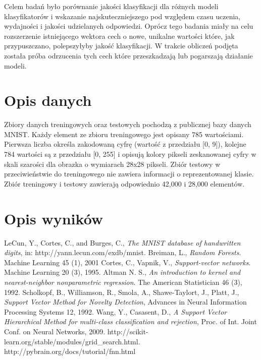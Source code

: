 \documentclass{article}
\begin{document}
Celem badań było porównanie jakości klasyfikacji dla różnych modeli klasyfikatorów i wskazanie najskuteczniejszego pod względem czasu uczenia, wydajności i jakości udzielanych odpowiedzi. Oprócz tego badania miały na celu rozszerzenie istniejącego wektora cech o nowe, unikalne wartości które, jak przypuszczano, polepszyłyby jakość klasyfikacji. W trakcie obliczeń podjęta została próba odrzucenia tych cech które przeszkadzają lub pogarszają działanie modeli. \\


\section{Opis danych}

Zbiory danych treningowych oraz testowych pochodzą z publicznej bazy danych MNIST\cite{mnist_database}. Każdy element ze zbioru treningowego jest opisany 785 wartościami. Pierwsza liczba określa zakodowaną cyfrę (wartość z przedziału [0, 9]), kolejne 784 wartości są z przedziału [0, 255] i opisują kolory pikseli zeskanowanej cyfry w skali szarości dla obrazka o wymiarach 28x28 pikseli. Zbiór testowy w przeciwieństwie do treningowego nie zawiera informacji o reprezentowanej klasie. Zbiór treningowy i testowy zawierają odpowiednio 42,000 i 28,000 elementów. \\


\section{Opis wyników}



\newpage
\begin{thebibliography}{9}
	 LeCun, Y., Cortes, C., and Burges, C., \emph{The MNIST database of handwritten digits}, in: http://yann.lecun.com/exdb/mnist.
	 Breiman, L., \emph{Random Forests}. Machine Learning 45 (1), 2001
	 Cortes, C., Vapnik, V., \emph{Support-vector networks}. Machine Learning 20 (3), 1995.	
	 Altman N. S., \emph{An introduction to kernel and nearest-neighbor nonparametric regression}. The American Statistician 46 (3), 1992.
     Scholkopf, B., Williamson, R., Smola, A., Shawe-Taylort, J., Platt, J., \emph{Support Vector Method for Novelty Detection}, Advances in Neural Information Processing Systems 12, 1992. 
     Wang, Y., Casasent, D., \emph{A Support Vector Hierarchical Method for multi-class classification and rejection}, Proc. of Int. Joint Conf. on Neural Networks, 2009.
     http://scikit-learn.org/stable/modules/grid\_search.html.
     http://pybrain.org/docs/tutorial/fnn.html


\end{thebibliography}
\end{document}
